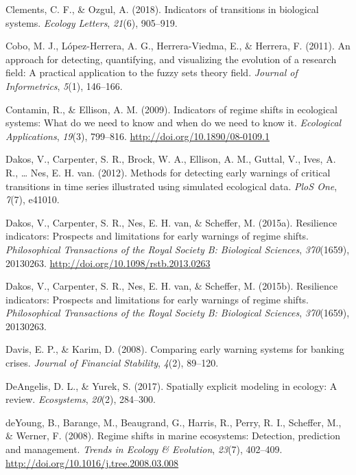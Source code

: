 \documentclass[12pt,twoside,openany]{reedthesis}
\begin{document}
\leavevmode\hypertarget{ref-clements2018indicators}{}%
Clements, C. F., \& Ozgul, A. (2018). Indicators of transitions in biological systems. \emph{Ecology Letters}, \emph{21}(6), 905--919.

\leavevmode\hypertarget{ref-cobo2011approach}{}%
Cobo, M. J., López-Herrera, A. G., Herrera-Viedma, E., \& Herrera, F. (2011). An approach for detecting, quantifying, and visualizing the evolution of a research field: A practical application to the fuzzy sets theory field. \emph{Journal of Informetrics}, \emph{5}(1), 146--166.

\leavevmode\hypertarget{ref-contamin_indicators_2009}{}%
Contamin, R., \& Ellison, A. M. (2009). Indicators of regime shifts in ecological systems: What do we need to know and when do we need to know it. \emph{Ecological Applications}, \emph{19}(3), 799--816. \url{http://doi.org/10.1890/08-0109.1}

\leavevmode\hypertarget{ref-dakos_methods_2012}{}%
Dakos, V., Carpenter, S. R., Brock, W. A., Ellison, A. M., Guttal, V., Ives, A. R., \ldots{} Nes, E. H. van. (2012). Methods for detecting early warnings of critical transitions in time series illustrated using simulated ecological data. \emph{PloS One}, \emph{7}(7), e41010.

\leavevmode\hypertarget{ref-dakos_resilience_2015}{}%
Dakos, V., Carpenter, S. R., Nes, E. H. van, \& Scheffer, M. (2015a). Resilience indicators: Prospects and limitations for early warnings of regime shifts. \emph{Philosophical Transactions of the Royal Society B: Biological Sciences}, \emph{370}(1659), 20130263. \url{http://doi.org/10.1098/rstb.2013.0263}

\leavevmode\hypertarget{ref-dakos2015resilience}{}%
Dakos, V., Carpenter, S. R., Nes, E. H. van, \& Scheffer, M. (2015b). Resilience indicators: Prospects and limitations for early warnings of regime shifts. \emph{Philosophical Transactions of the Royal Society B: Biological Sciences}, \emph{370}(1659), 20130263.

\leavevmode\hypertarget{ref-davis_comparing_2008}{}%
Davis, E. P., \& Karim, D. (2008). Comparing early warning systems for banking crises. \emph{Journal of Financial Stability}, \emph{4}(2), 89--120.

\leavevmode\hypertarget{ref-deangelis2017spatially}{}%
DeAngelis, D. L., \& Yurek, S. (2017). Spatially explicit modeling in ecology: A review. \emph{Ecosystems}, \emph{20}(2), 284--300.

\leavevmode\hypertarget{ref-deyoung_regime_2008}{}%
deYoung, B., Barange, M., Beaugrand, G., Harris, R., Perry, R. I., Scheffer, M., \& Werner, F. (2008). Regime shifts in marine ecosystems: Detection, prediction and management. \emph{Trends in Ecology \& Evolution}, \emph{23}(7), 402--409. \url{http://doi.org/10.1016/j.tree.2008.03.008}
\end{document}

